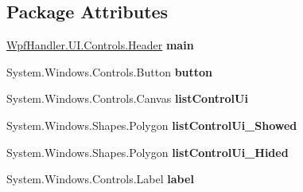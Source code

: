 \subsection*{Package Attributes}
\begin{DoxyCompactItemize}
\item 
\mbox{\label{class_wpf_handler_1_1_u_i_1_1_controls_1_1_header_ac6b6eb0ae388af1282a5dde380abd4f1}} 
\mbox{\hyperlink{class_wpf_handler_1_1_u_i_1_1_controls_1_1_header}{Wpf\+Handler.\+U\+I.\+Controls.\+Header}} {\bfseries main}
\item 
\mbox{\label{class_wpf_handler_1_1_u_i_1_1_controls_1_1_header_a0c41a0e112b170298f34dd1afe555466}} 
System.\+Windows.\+Controls.\+Button {\bfseries button}
\item 
\mbox{\label{class_wpf_handler_1_1_u_i_1_1_controls_1_1_header_a4dca87c9678237c9b2af0dd3dc0bb2e0}} 
System.\+Windows.\+Controls.\+Canvas {\bfseries list\+Control\+Ui}
\item 
\mbox{\label{class_wpf_handler_1_1_u_i_1_1_controls_1_1_header_a457a413551d46e0674c51d22cbc1dd4f}} 
System.\+Windows.\+Shapes.\+Polygon {\bfseries list\+Control\+Ui\+\_\+\+Showed}
\item 
\mbox{\label{class_wpf_handler_1_1_u_i_1_1_controls_1_1_header_a1fc08ceb38e9267375a64117ea03cfae}} 
System.\+Windows.\+Shapes.\+Polygon {\bfseries list\+Control\+Ui\+\_\+\+Hided}
\item 
\mbox{\label{class_wpf_handler_1_1_u_i_1_1_controls_1_1_header_ab10ca0ccba374875757330fdd30ddab0}} 
System.\+Windows.\+Controls.\+Label {\bfseries label}
\end{DoxyCompactItemize}

